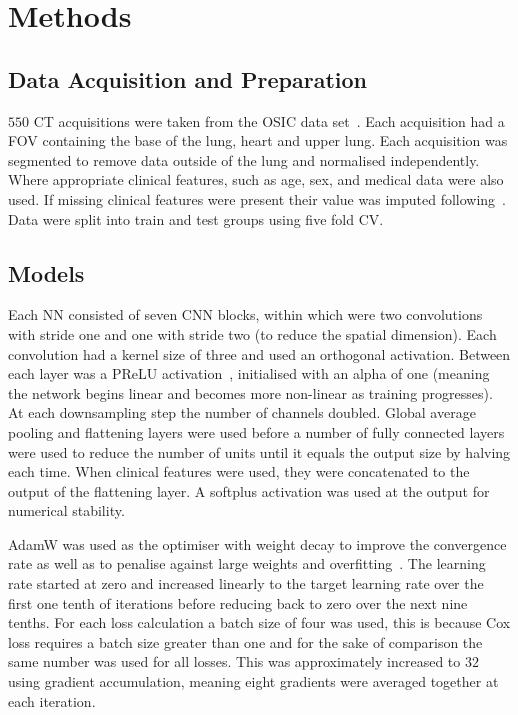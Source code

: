
\section{Methods} \label{sec:methods}
    \subsection{Data Acquisition and Preparation} \label{sec:data_acquisition_and_preparation}
        $550$ \gls{CT} acquisitions were taken from the \gls{OSIC} data set~\cite{OSICRepository}. Each acquisition had a \gls{FOV} containing the base of the lung, heart and upper lung. Each acquisition was segmented to remove data outside of the lung and normalised independently. Where appropriate clinical features, such as age, sex, and medical data were also used. If missing clinical features were present their value was imputed following~\cite{Shahin2022SurvivalData}. Data were split into train and test groups using five fold \gls{CV}.

    \subsection{Models} \label{sec:models}
        Each \gls{NN} consisted of seven \gls{CNN} blocks, within which were two convolutions with stride one and one with stride two (to reduce the spatial dimension). Each convolution had a kernel size of three and used an orthogonal activation. Between each layer was a \gls{PReLU} activation~\cite{He2015DelvingClassification}, initialised with an alpha of one (meaning the network begins linear and becomes more non-linear as training progresses). At each downsampling step the number of channels doubled. Global average pooling and flattening layers were used before a number of fully connected layers were used to reduce the number of units until it equals the output size by halving each time. When clinical features were used, they were concatenated to the output of the flattening layer. A softplus activation was used at the output for numerical stability.

        AdamW was used as the optimiser with weight decay to improve the convergence rate as well as to penalise against large weights and overfitting~\cite{Loshchilov2019DecoupledRegularization}. The learning rate started at zero and increased linearly to the target learning rate over the first one tenth of iterations before reducing back to zero over the next nine tenths. For each loss calculation a batch size of four was used, this is because Cox loss requires a batch size greater than one and for the sake of comparison the same number was used for all losses. This was approximately increased to $32$ using gradient accumulation, meaning eight gradients were averaged together at each iteration.

